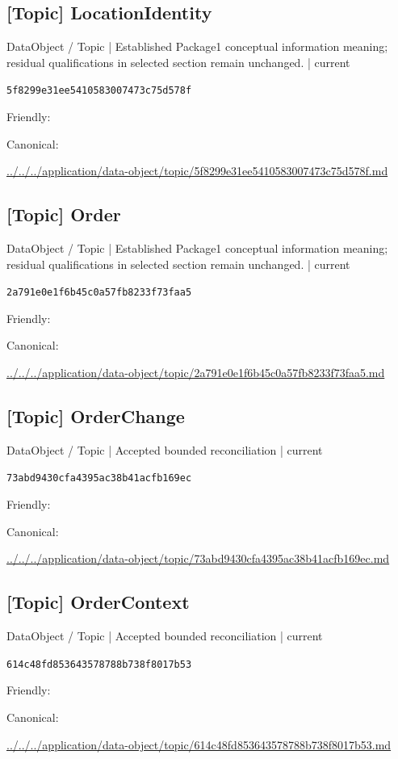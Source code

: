 \documentclass[10pt,a4paper]{article}
\begin{document}
\subsection*{[Topic] LocationIdentity}
{\small DataObject / Topic | Established Package1 conceptual information meaning; residual qualifications in selected section remain unchanged. | current}\par
\texttt{5f8299e31ee5410583007473c75d578f}\par
Friendly: \par
Canonical: \par
{\footnotesize\url{../../../application/data-object/topic/5f8299e31ee5410583007473c75d578f.md}}\par
\subsection*{[Topic] Order}
{\small DataObject / Topic | Established Package1 conceptual information meaning; residual qualifications in selected section remain unchanged. | current}\par
\texttt{2a791e0e1f6b45c0a57fb8233f73faa5}\par
Friendly: \par
Canonical: \par
{\footnotesize\url{../../../application/data-object/topic/2a791e0e1f6b45c0a57fb8233f73faa5.md}}\par
\subsection*{[Topic] OrderChange}
{\small DataObject / Topic | Accepted bounded reconciliation | current}\par
\texttt{73abd9430cfa4395ac38b41acfb169ec}\par
Friendly: \par
Canonical: \par
{\footnotesize\url{../../../application/data-object/topic/73abd9430cfa4395ac38b41acfb169ec.md}}\par
\subsection*{[Topic] OrderContext}
{\small DataObject / Topic | Accepted bounded reconciliation | current}\par
\texttt{614c48fd853643578788b738f8017b53}\par
Friendly: \par
Canonical: \par
{\footnotesize\url{../../../application/data-object/topic/614c48fd853643578788b738f8017b53.md}}\par
\end{document}

